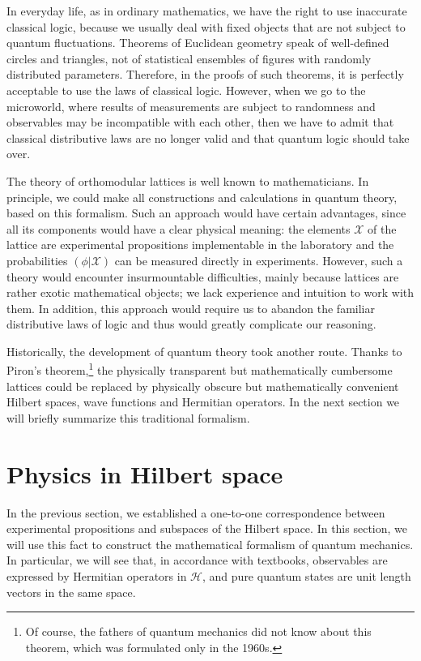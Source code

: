 \documentclass[nochecklpage]{stefan1}
\theoremstyle{definition}
\begin{document}
In everyday life, as in ordinary mathematics, we have the right to use
inaccurate classical logic, because we usually deal with fixed objects
that are not subject to quantum fluctuations. Theorems of Euclidean
geometry speak of well-defined circles and triangles, not of statistical
ensembles of figures with randomly distributed parameters. Therefore,
in the proofs of such theorems, it is perfectly acceptable to use the
laws of classical logic. However, when we go to the microworld, where
results of measurements are subject to randomness and observables may
be incompatible with each other, then we have to admit that classical
distributive laws are no longer valid and that quantum logic should take
over.

The theory of orthomodular lattices is well known to mathematicians. In
principle, we could make all constructions and calculations in quantum
theory, based on this formalism. Such an approach would have certain
advantages, since all its components would have a clear physical
meaning: the elements $ \mathcal{X} $ of the lattice are experimental
propositions implementable in the laboratory and the probabilities
$ (\phi | \mathcal{X}) $ can be measured directly in experiments.
However, such a theory would encounter insurmountable difficulties,
mainly because lattices are rather exotic mathematical objects; we lack
experience and intuition to work with them. In addition, this approach
would require us to abandon the familiar distributive laws of logic and
thus would greatly complicate our reasoning.

Historically, the development of quantum theory took another route.
Thanks to Piron's theorem,\footnote{Of course, the fathers of quantum
mechanics did not know about this theorem, which was formulated only in
the 1960s.} the physically transparent but mathematically cumbersome
lattices could be replaced by physically obscure but mathematically
convenient Hilbert spaces, wave functions and Hermitian operators. In
the next section we will briefly summarize this traditional formalism.

\section{Physics in Hilbert space}\label{ss:quant-obs}
In the previous section, we established a one-to-one correspondence
between experimental propositions and subspaces of the Hilbert space.
In this section, we will use this fact to construct the mathematical
formalism of quantum mechanics. In particular, we will see that, in
accordance with textbooks, observables are expressed by Hermitian
operators in $ \mathscr{H} $, and pure quantum states are unit length
vectors in the same space.%
\end{document}

